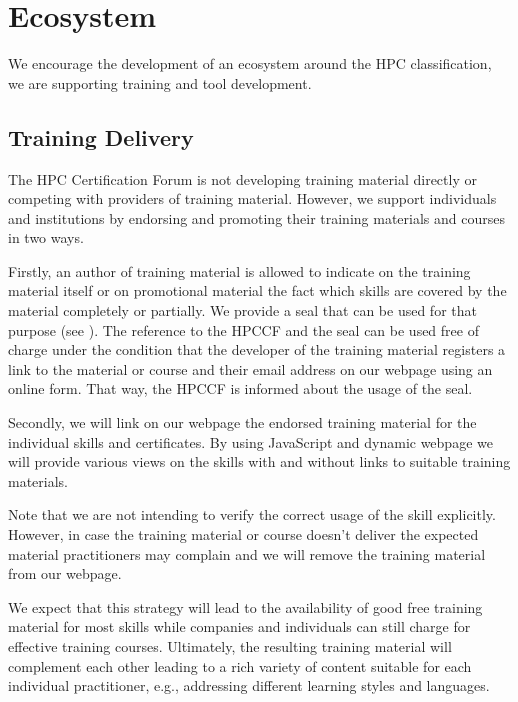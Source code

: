 \documentclass[jocse]{jocseart}
\newcommand{\kh}[1]{\todo[inline]{KH: #1}}
\begin{document}
\section{Ecosystem}
\label{sec:ecosystem}

We encourage the development of an ecosystem around the HPC classification, we are supporting training and tool development.

\subsection{Training Delivery}

The HPC Certification Forum is not developing training material directly or competing with providers of training material.
However, we support individuals and institutions by endorsing and promoting their training materials and courses in two ways.

Firstly, an author of training material is allowed to indicate on the training material itself or on promotional material the fact
which skills are covered by the material completely or partially.
We provide a seal that can be used for that purpose (see ).
The reference to the HPCCF and the seal can be used free of charge under the condition that the developer of the training material
registers a link to the material or course and their\kh{Plural hier beabsichtigt (Bezug?)} email address on our webpage using an online form.
That way, the HPCCF is informed about the usage of the seal.

Secondly, we will link on our webpage the endorsed training material for the individual skills and certificates.
By using JavaScript and dynamic webpage we will provide various views on the skills with and without links to suitable training materials.

Note that we are not intending to verify the correct usage of the skill explicitly.
However, in case the training material or course doesn't deliver the expected material practitioners may complain and we will remove the training material from our webpage.

We expect that this strategy will lead to the availability of good free training material for most skills while companies and individuals can still charge for effective training courses.
Ultimately, the resulting training material will complement each other leading to a rich variety of content suitable for each individual practitioner, e.g., addressing different learning styles and languages.
\end{document}
